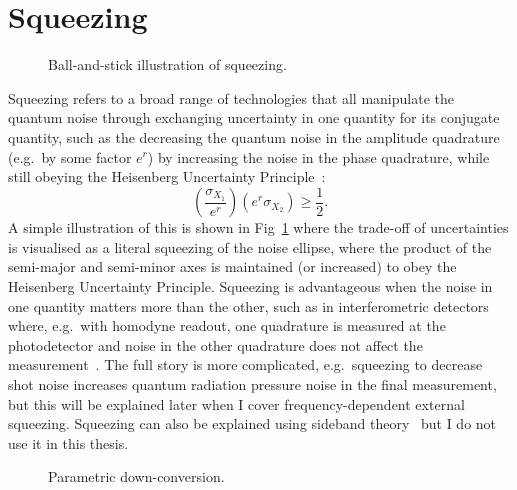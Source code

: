 \section{Squeezing}
\label{sec:squeezing_background}

\begin{figure}
	\centering
	\caption{Ball-and-stick illustration of squeezing.}
	\label{fig:ballandstick_simple}
\end{figure}

Squeezing refers to a broad range of technologies that all manipulate the quantum noise through exchanging uncertainty in one quantity for its conjugate quantity, such as the decreasing the quantum noise in the amplitude quadrature (e.g.\ by some factor $e^r$) by increasing the noise in the phase quadrature, while still obeying the Heisenberg Uncertainty Principle~\cite{}: \begin{equation}(\frac{\sigma_{X_1}}{e^r}) (e^r\sigma_{X_2})\geq\frac{1}{2}\label{eq:HUP_squeezed}.\end{equation} A simple illustration of this is shown in Fig~\ref{fig:ballandstick_simple} where the trade-off of uncertainties is visualised as a literal squeezing of the noise ellipse, where the product of the semi-major and semi-minor axes is maintained (or increased) to obey the Heisenberg Uncertainty Principle. Squeezing is advantageous when the noise in one quantity matters more than the other, such as in interferometric detectors where, e.g.\ with homodyne readout, one quadrature is measured at the photodetector and noise in the other quadrature does not affect the measurement~\cite{}.  The full story is more complicated, e.g.\ squeezing to decrease shot noise increases quantum radiation pressure noise in the final measurement, but this will be explained later when I cover frequency-dependent external squeezing. Squeezing can also be explained using sideband theory~\cite{} but I do not use it in this thesis.

\begin{figure}
	\centering
	\caption{Parametric down-conversion.}
	\label{fig:PDC_deg_and_nondeg}
\end{figure}

